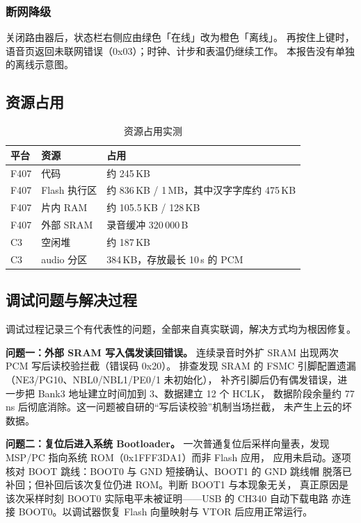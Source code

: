 \subsubsection{断网降级}
关闭路由器后，状态栏右侧应由绿色「在线」改为橙色「离线」。
再按住上键时，语音页返回未联网错误（0x03）；时钟、计步和表温仍继续工作。
本报告没有单独的离线示意图。

\subsection{资源占用}
\begin{table}[htbp]
\centering\small
\caption{资源占用实测}\label{tab:resource}
\begin{tabular}{@{}llp{8.2cm}@{}}
\toprule
平台 & 资源 & 占用\\
\midrule
F407 & 代码 & 约 245\,KB\\
F407 & Flash 执行区 & 约 836\,KB / 1\,MB，其中汉字字库约 475\,KB\\
F407 & 片内 RAM & 约 105.5\,KB / 128\,KB\\
F407 & 外部 SRAM & 录音缓冲 320\,000\,B\\
C3 & 空闲堆 & 约 187\,KB\\
C3 & audio 分区 & 384\,KB，存放最长 10\,s 的 PCM\\
\bottomrule
\end{tabular}
\end{table}

\subsection{调试问题与解决过程}
调试过程记录三个有代表性的问题，全部来自真实联调，解决方式均为根因修复。

\textbf{问题一：外部 SRAM 写入偶发读回错误。}
连续录音时外扩 SRAM 出现两次 PCM 写后读校验拦截（错误码 0x20）。
排查发现 SRAM 的 FSMC 引脚配置遗漏（NE3/PG10、NBL0/NBL1/PE0/1 未初始化），
补齐引脚后仍有偶发错误，进一步把 Bank3 地址建立时间加到 3、数据建立 12 个 HCLK，
数据阶段余量约 77\,ns 后彻底消除。这一问题被自研的``写后读校验''机制当场拦截，
未产生上云的坏数据。

\textbf{问题二：复位后进入系统 Bootloader。}
一次普通复位后采样向量表，发现 MSP/PC 指向系统 ROM（0x1FFF3DA1）而非 Flash 应用，
应用未启动。逐项核对 BOOT 跳线：BOOT0 与 GND 短接确认、BOOT1 的 GND 跳线帽
脱落已补回；但补回后该次复位仍进 ROM。判断 BOOT1 与本现象无关，
真正原因是该次采样时刻 BOOT0 实际电平未被证明——USB 的 CH340 自动下载电路
亦连接 BOOT0。以调试器恢复 Flash 向量映射与 VTOR 后应用正常运行。

